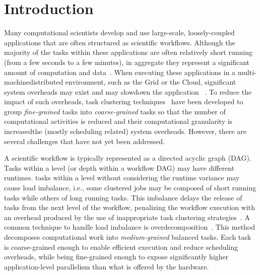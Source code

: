 
\section{Introduction}
\label{intro}
Many computational scientists develop and use large-scale, loosely-coupled applications that are often structured as scientific workflows. Although the majority of the tasks within these applications are often relatively short running (from a few seconds to a few minutes), in aggregate they represent a significant amount of computation and data~\cite{daSilva:2013:TFO:2534248.2534254,Juve2013}. When executing these applications in a multi-machine\rev{, }distributed environment, such as the Grid or the Cloud, significant system overheads may exist and may slowdown the application ~\cite{Chen2011}. To reduce the impact of such overheads, task clustering techniques~\cite{Muthuvelu:2005:DJG:1082290.1082297,4493929,Muthuvelu2010,Muthuvelu2013170,keat-2006,ang-2009,Liu2009,Singh:2008:WTC:1341811.1341822,Ferreira-granularity-2013} have been developed to group \emph{fine-grained} tasks into \emph{coarse-grained} tasks so that the number of computational activities is reduced and their computational granularity is increasedthe (mostly scheduling related) system overheads.
However, there are several challenges that have not yet been addressed.

A scientific workflow is typically represented as a directed acyclic graph (DAG). Tasks within a level (or depth within a workflow DAG) may have different runtimes. tasks within a level without considering the runtime variance may cause load imbalance, i.e., some clustered jobs may be composed of short running tasks while others of long running tasks. This imbalance delays the release of tasks from the next level of the workflow, penalizing the workflow execution with an overhead produced by the use of inappropriate task clustering strategies~\cite{Chen2013}.
A common technique to handle load imbalance is overdecomposition~\cite{Lifflander}.
This method decomposes computational work into \emph{medium-grained} balanced tasks. Each task is coarse-grained enough to enable efficient execution and reduce scheduling overheads, while being fine-grained enough to expose significantly higher application-level parallelism than what is offered by the hardware. 

